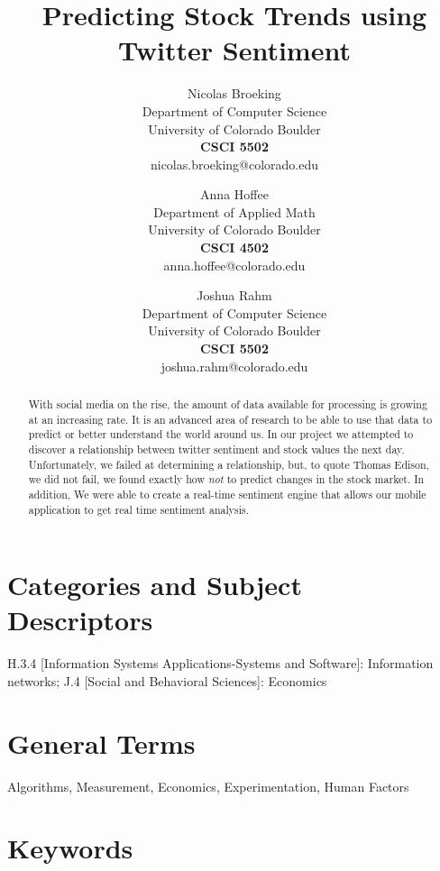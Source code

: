 \documentclass{acm_proc_article-sp}
\title{Predicting Stock Trends using Twitter Sentiment}
\author{
    Nicolas Broeking \\
    \small Department of Computer Science \\
    \small University of Colorado Boulder \\
    \small \textbf{CSCI 5502} \\
    \small nicolas.broeking@colorado.edu \\
    \and
    Anna Hoffee \\
    \small Department of Applied Math \\
    \small University of Colorado Boulder \\
    \small \textbf{CSCI 4502} \\
    \small anna.hoffee@colorado.edu \\
    \and
    Joshua Rahm \\
    \small Department of Computer Science \\
    \small University of Colorado Boulder \\
    \small \textbf{CSCI 5502} \\
    \small joshua.rahm@colorado.edu \\
}
\begin{document}
\nocite{*}


\maketitle

\begin{abstract} 

With social media on the rise, the amount of data available for processing is
growing at an increasing rate. It is an advanced area of research to be able to
use that data to predict or better understand the world around us. In our
project we attempted to discover a relationship between twitter sentiment and
stock values the next day. Unfortunately, we failed at determining a
relationship, but, to quote Thomas Edison, we did not fail, we found exactly how \emph{not}
to predict changes in the stock market. In addition, We were able to create a real-time
sentiment engine that allows our mobile application to get real time sentiment
analysis.

\end{abstract}

\section*{Categories and Subject\\ Descriptors}

H.3.4 [Information Systems Applications-Systems and Software]: Information
networks; J.4 [Social and Behavioral Sciences]: Economics

\section*{General Terms}
Algorithms, Measurement, Economics, Experimentation, Human Factors

\section*{Keywords}
\end{document}
